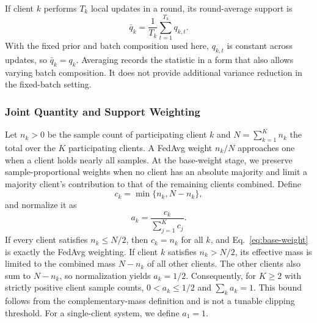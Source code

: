 \documentclass[lettersize,journal]{IEEEtran}
\begin{document}
If client $k$ performs $T_k$ local updates in a round, its round-average support is
\begin{equation}
\bar q_k=\frac{1}{T_k}\sum_{t=1}^{T_k}q_{k,t}.
\label{eq:mean-support}
\end{equation}
With the fixed prior and batch composition used here, $q_{k,t}$ is constant across updates, so $\bar q_k=q_k$. Averaging records the statistic in a form that also allows varying batch composition. It does not provide additional variance reduction in the fixed-batch setting.

\subsubsection{Joint Quantity and Support Weighting}

Let $n_k>0$ be the sample count of participating client $k$ and $N=\sum_{k=1}^K n_k$ the total over the $K$ participating clients. A FedAvg weight $n_k/N$ approaches one when a client holds nearly all samples. At the base-weight stage, we preserve sample-proportional weights when no client has an absolute majority and limit a majority client's contribution to that of the remaining clients combined. Define
\begin{equation}
c_k=\min\{n_k,N-n_k\},
\label{eq:complementary-mass}
\end{equation}
and normalize it as
\begin{equation}
a_k=\frac{c_k}{\sum_{j=1}^{K}c_j}.
\label{eq:base-weight}
\end{equation}
If every client satisfies $n_k\leq N/2$, then $c_k=n_k$ for all $k$, and Eq.~\eqref{eq:base-weight} is exactly the FedAvg weighting. If client $k$ satisfies $n_k>N/2$, its effective mass is limited to the combined mass $N-n_k$ of all other clients. The other clients also sum to $N-n_k$, so normalization yields $a_k=1/2$. Consequently, for $K\geq2$ with strictly positive client sample counts, $0<a_k\leq1/2$ and $\sum_k a_k=1$. This bound follows from the complementary-mass definition and is not a tunable clipping threshold. For a single-client system, we define $a_1=1$.
\end{document}
